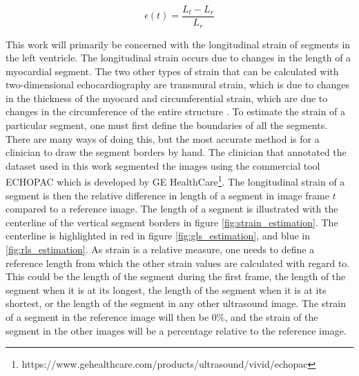 \begin{equation}
    \epsilon(t) = \frac{L_t - L_r}{L_r}
    \label{eq:linear_strain}
\end{equation}

This work will primarily be concerned with the longitudinal strain of segments in the left ventricle. The longitudinal strain occurs due to changes in the length of a myocardial segment. The two other types of strain that can be calculated with two-dimensional echocardiography are transmural strain, which is due to changes in the thickness of the myocard and circumferential strain, which are due to changes in the circumference of the entire structure \cite{basic_concepts}. To estimate the strain of a particular segment, one must first define the boundaries of all the segments. There are many ways of doing this, but the most accurate method is for a clinician to draw the segment borders by hand. The clinician that annotated the dataset used in this work segmented the images using the commercial tool ECHOPAC which is developed by GE HealthCare\footnote{https://www.gehealthcare.com/products/ultrasound/vivid/echopac}. The longitudinal strain of a segment is then the relative difference in length of a segment in image frame $t$ compared to a reference image. The length of a segment is illustrated with the centerline of the vertical segment borders in figure \ref{fig:strain_estimation}. The centerline is highlighted in red in figure \ref{fig:gls_estimation}, and blue in \ref{fig:rls_estimation}. As strain is a relative measure, one needs to define a reference length from which the other strain values are calculated with regard to. This could be the length of the segment during the first frame, the length of the segment when it is at its longest, the length of the segment when it is at its shortest, or the length of the segment in any other ultrasound image. The strain of a segment in the reference image will then be $0\%$, and the strain of the segment in the other images will be a percentage relative to the reference image. 

